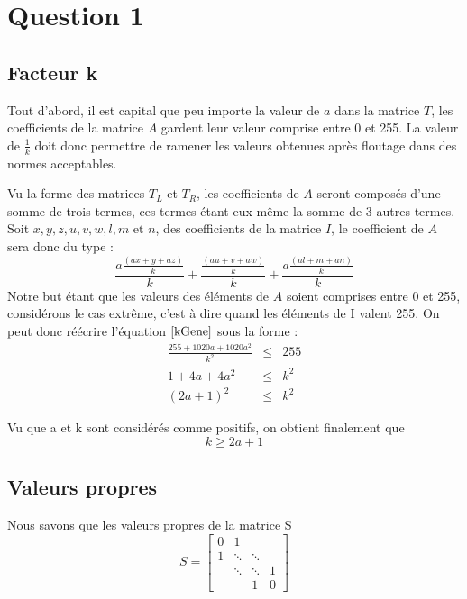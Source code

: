 \section{Question 1}

\subsection{Facteur k}
Tout d'abord, il  est capital que peu importe la valeur de $\textit{a}$ dans la matrice $\textit{T}$,
les coefficients de la matrice $\textit{A}$ gardent leur valeur comprise entre 0 et 255.
La valeur de $\frac{1}{k}$ doit donc permettre de ramener les valeurs obtenues après floutage dans des normes acceptables.

Vu la forme des matrices $T_L$ et $T_R$, les coefficients de $A$ seront composés d'une somme de trois termes,
ces termes étant eux même la somme de 3 autres termes.
Soit $x,y,z, u, v, w, l, m \text{ et } n$, des coefficients de la matrice $I$,
le coefficient de $A$ sera donc du type :
\begin{equation} \label{kGene}
  \frac{a \frac{(ax+y+az)}{k}}{k} + \frac{\frac{(au+v+aw)}{k}}{k} + \frac{a \frac{(al+m+an)}{k}}{k}
\end{equation}
Notre but étant que les valeurs des éléments de $A$	soient comprises entre 0 et 255, considérons le cas extrême,
c'est à dire quand les éléments de I valent 255.
On peut donc réécrire l'équation $\ref{kGene}$ sous la forme :
\begin{eqnarray}
\frac{255+1020a+1020a^2}{k^2} &\leq & 255 \\
1+4a+4a^2 &\leq & k^2 \\
(2a+1)^2 &\leq & k^2
\end{eqnarray}

Vu que a et k sont considérés comme positifs, on obtient finalement que
	\begin{equation}
	k \geq 2a+1
	\end{equation}

\subsection{Valeurs propres}
	Nous savons que les valeurs propres de la matrice S
	$$
S =
 \left[
 \begin{array}{cccc}
    0 & 1 		& 			& \\
    1 & \ddots 	& \ddots 	& \\
      & \ddots 	& \ddots 	& 1 \\
      & 		& 1			& 0
  \end{array}
  \right]
$$

